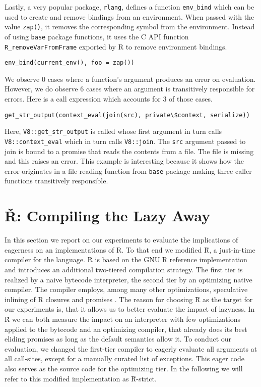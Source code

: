\documentclass[review,nonacm,screen,acmsmall,anonymous=true]{acmart}
\newcommand{\authorcomment}[3]{}
\newcommand{\AG}[1]{\authorcomment{orange}{AG}{#1}}
\newcommand{\code}[1]{\lstinline |#1|\xspace}
\renewcommand{\Rsh}{{\sf\u R}\xspace}
\newcommand{\Rshstrict}{{\sf\u R-strict}\xspace}
\begin{document}
Lastly, a very popular package, \code{rlang}, defines a function \code{env_bind}
which can be used to create and remove bindings from an environment. When passed
with the value \code{zap()}, it removes the corresponding symbol from the
environment. Instead of using \code{base} package functions, it uses the C API
function \code{R_removeVarFromFrame} exported by R to remove environment
bindings.
%
\begin{lstlisting}
env_bind(current_env(), foo = zap())
\end{lstlisting}
%
We observe 0 cases where a function's argument produces an error on evaluation.
However, we do observe 6 cases where an argument is transitively responsible for
errors. Here is a call expression which accounts for 3 of those cases.
%
\begin{lstlisting}
get_str_output(context_eval(join(src), private\$context, serialize))
\end{lstlisting}
%
Here, \code{V8::get_str_output} is called whose first argument in turn calls
\code{V8::context_eval} which in turn calls \code{V8::join}. The \code{src}
argument passed to join is bound to a promise that reads the contents from a
file. The file is missing and this raises an error. This example is interesting
because it shows how the error originates in a file reading function from
\code{base} package making three caller functions transitively responsible.

\AG{TODO: appeal to intuition for lookups since the actual examples are hard to decipher.}

\section{Ř: Compiling the Lazy Away}\label{sec:rsh}

In this section we report on our experiments to evaluate the implications of
eagerness on an implementations of R. To that end we modified \Rsh, a just-in-time
compiler for the language. \Rsh is based on the GNU R reference implementation
and introduces an additional two-tiered compilation strategy. The
first tier is realized by a naive bytecode interpreter, the second tier
by an optimizing native compiler. The compiler employs, among many other
optimizations, speculative inlining of R closures and promises \citep{dls19,
oopsla20c}.
The reason for choosing \Rsh as the target for our
experiments is, that it allows us to better evaluate the impact of lazyness. In
\Rsh we can both measure the impact on an interpreter with few optimizations
applied to the bytecode and an optimizing compiler, that already does its best
eliding promises as long as the default semantics allow it.
To conduct our evaluation, we changed the first-tier
compiler to eagerly evaluate all arguments at all call-sites, except for a
manually curated list of exceptions. This eager code also serves as the source
code for the optimizing tier. In the following we will refer
to this modified implementation as \Rshstrict.
\end{document}
